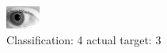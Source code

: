 \begin{figure}[h!]
\begin{center}
\includegraphics[width=0.60\columnwidth]{figures/ID314_class_4_target_3.png}
\end{center}
\caption{ Classification: 4 actual target: 3}
\label{fig:ID314_class_4_target_3}
\end{figure}
